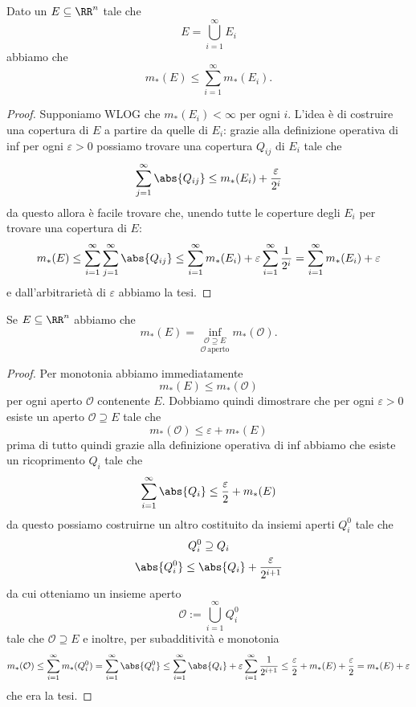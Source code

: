 \documentclass[11pt]{scrartcl}
\begin{document}
	\begin{proposition}
		Dato un $E\subseteq \RR^n$ tale che
		$$E=\bigcup_{i=1}^\infty E_i$$
		abbiamo che
		$$m_*(E)\le \sum_{i=1}^{\infty}m_*(E_i).$$
	\end{proposition}
	\begin{proof}
		Supponiamo WLOG che $m_*(E_i)<\infty$ per ogni $i$. L'idea è di costruire una copertura di $E$ a partire da quelle di $E_i$: grazie alla definizione operativa di inf per ogni $\varepsilon>0$ possiamo trovare una copertura $Q_{ij}$ di $E_i$ tale che
		$$\sum_{j=1}^{\infty}\abs{Q_{ij}}\le m_*(E_i)+\frac{\varepsilon}{2^i}$$
		da questo allora è facile trovare che, unendo tutte le coperture degli $E_i$ per trovare una copertura di $E$:
		$$m_*(E)\le \sum_{i=1}^{\infty}\sum_{j=1}^{\infty}\abs{Q_{ij}}\le \sum_{i=1}^{\infty}m_*(E_i)+\varepsilon\sum_{i=1}^{\infty}\frac{1}{2^i}=\sum_{i=1}^{\infty}m_*(E_i)+\varepsilon$$
		e dall'arbitrarietà di $\varepsilon$ abbiamo la tesi.
	\end{proof}
	\begin{proposition}
		Se $E\subseteq\RR^n$ abbiamo che
		$$m_*(E)=\underset{\mathcal{O}\,\text{aperto}}{{\inf_{\mathcal{O}\supseteq E}}} m_*(\mathcal{O}).$$
	\end{proposition}
	\begin{proof}
		Per monotonia abbiamo immediatamente
		$$m_*(E)\le m_*(\mathcal{O})$$
		per ogni aperto $\mathcal{O}$ contenente $E$. Dobbiamo quindi dimostrare che per ogni $\varepsilon>0$ esiste un aperto $\mathcal{O}\supseteq E$ tale che
		$$m_*(\mathcal{O})\le \varepsilon + m_*(E)$$
		prima di tutto quindi grazie alla definizione operativa di inf abbiamo che esiste un ricoprimento $Q_i$ tale che
		$$\sum_{i=1}^{\infty}\abs{Q_i}\le \frac{\varepsilon}{2}+m_*(E)$$
		da questo possiamo costruirne un altro costituito da insiemi aperti $Q^0_{i}$ tale che
		\begin{gather*}
			Q_i^0\supseteq Q_i \\
			\abs{Q_i^0}\le \abs{Q_i} + \frac{\varepsilon}{2^{i+1}}
		\end{gather*}
		da cui otteniamo un insieme aperto 
		$$\mathcal{O}:=\bigcup_{i=1}^\infty Q_i^0$$
		tale che $\mathcal{O}\supseteq E$ e inoltre, per subadditività e monotonia
		$$m_*(\mathcal{O})\le \sum_{i=1}^{\infty}m_*(Q_i^0)=\sum_{i=1}^{\infty}\abs{Q_i^0}\le \sum_{i=1}^{\infty}\abs{Q_i}+\varepsilon\sum_{i=1}^{\infty}\frac{1}{2^{i+1}}\le \frac{\varepsilon}{2}+m_*(E)+\frac{\varepsilon}{2}=m_*(E)+\varepsilon$$
		che era la tesi.
	\end{proof}
\end{document}
